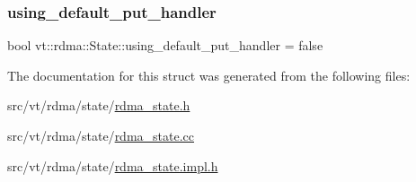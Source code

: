\mbox{\label{structvt_1_1rdma_1_1_state_ad3d72847190c02761393d124cb07a917}} 
\subsubsection{\texorpdfstring{using\+\_\+default\+\_\+put\+\_\+handler}{using\_default\_put\_handler}}
{\footnotesize\ttfamily bool vt\+::rdma\+::\+State\+::using\+\_\+default\+\_\+put\+\_\+handler = false}



The documentation for this struct was generated from the following files\+:\begin{DoxyCompactItemize}
\item 
src/vt/rdma/state/\hyperlink{rdma__state_8h}{rdma\+\_\+state.\+h}\item 
src/vt/rdma/state/\hyperlink{rdma__state_8cc}{rdma\+\_\+state.\+cc}\item 
src/vt/rdma/state/\hyperlink{rdma__state_8impl_8h}{rdma\+\_\+state.\+impl.\+h}\end{DoxyCompactItemize}
